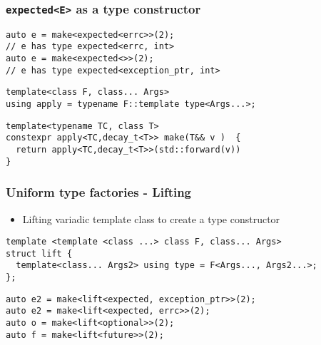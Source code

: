 \documentclass[xcolor=dvipsnames]{beamer}
\newcommand{\cpp}[1]{\lstinline{#1}}
\begin{document}
\begin{frame}[fragile]
\frametitle{\cpp{expected<E>} as a type constructor}

\begin{lstlisting}
auto e = make<expected<errc>>(2); 
// e has type expected<errc, int>
auto e = make<expected<>>(2); 
// e has type expected<exception_ptr, int>
\end{lstlisting}

\begin{lstlisting}
template<class F, class... Args>
using apply = typename F::template type<Args...>;
\end{lstlisting}
  
\begin{lstlisting}
template<typename TC, class T>
constexpr apply<TC,decay_t<T>> make(T&& v )  {
  return apply<TC,decay_t<T>>(std::forward(v))
}
\end{lstlisting}

\end{frame}
\begin{frame}[fragile]
\frametitle{Uniform type factories - Lifting }

\begin{itemize}
  \item Lifting variadic template class to create a type constructor 
\end{itemize}

\begin{lstlisting}
template <template <class ...> class F, class... Args>
struct lift {
  template<class... Args2> using type = F<Args..., Args2...>;
};
\end{lstlisting} 

\begin{lstlisting}
auto e2 = make<lift<expected, exception_ptr>>(2); 
auto e2 = make<lift<expected, errc>>(2);
auto o = make<lift<optional>>(2); 
auto f = make<lift<future>>(2); 
\end{lstlisting}

\end{frame}
\end{document}
